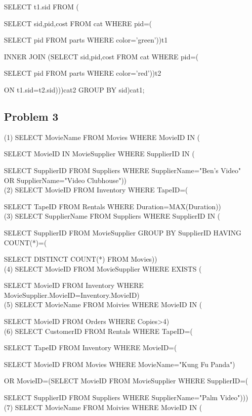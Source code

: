 \documentclass{article}
\begin{document}
        SELECT t1.sid FROM (
        
        SELECT sid,pid,cost FROM cat WHERE pid=(
        
        SELECT pid FROM parts WHERE color='green'))t1

        INNER JOIN (SELECT sid,pid,cost FROM cat WHERE pid=(
            
        SELECT pid FROM parts WHERE color='red'))t2 
        
        ON t1.sid=t2.sid)))cat2 GROUP BY sid)cat1;


    \subsection*{Problem 3}
    (1) SELECT MovieName FROM Movies WHERE MovieID IN (

        SELECT MovieID IN MovieSupplier WHERE SupplierID IN (

        SELECT SupplierID FROM Suppliers WHERE SupplierName="Ben's Video" OR SupplierName="Video Clubhouse"))\\
    (2) SELECT MovieID FROM Inventory WHERE TapeID=(
        
        SELECT TapeID FROM Rentals WHERE Duration=MAX(Duration))\\
    (3) SELECT SupplierName FROM Suppliers WHERE SupplierID IN (
        
        SELECT SupplierID FROM MovieSupplier GROUP BY SupplierID HAVING COUNT(*)=(
            
        SELECT DISTINCT COUNT(*) FROM Movies))\\
    (4) SELECT MovieID FROM MovieSupplier WHERE EXISTS (
        
        SELECT MovieID FROM Inventory WHERE MovieSupplier.MovieID=Inventory.MovieID)\\
    (5) SELECT MovieName FROM Moivies WHERE MovieID IN (

        SELECT MovieID FROM Orders WHERE Copies>4)\\
    (6) SELECT CustomerID FROM Rentals WHERE TapeID=(
        
        SELECT TapeID FROM Inventory WHERE MovieID=(
            
        SELECT MovieID FROM Movies WHERE MovieName="Kung Fu Panda")
        
        OR MovieID=(SELECT MovieID FROM MovieSupplier WHERE SupplierID=(
            
        SELECT SupplierID FROM Suppliers WHERE SupplierName="Palm Video")))\\
    (7) SELECT MovieName FROM Moivies WHERE MovieID IN (
        
\end{document}
